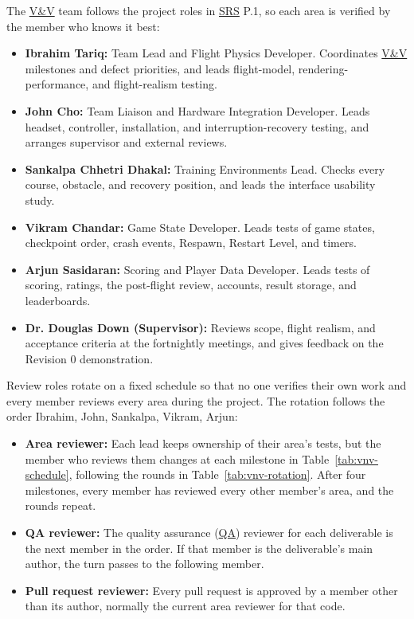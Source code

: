 \documentclass[12pt, titlepage]{article}
\begin{document}
The \hyperlink{abbr:VnV}{V\&V} team follows the project roles in \hyperlink{abbr:SRS}{SRS} P.1, so each area is verified by the
member who knows it best:

\begin{itemize}
  \item \textbf{Ibrahim Tariq:} Team Lead and Flight Physics Developer. Coordinates \hyperlink{abbr:VnV}{V\&V}
  milestones and defect priorities, and leads flight-model, rendering-performance, and
  flight-realism testing.
  \item \textbf{John Cho:} Team Liaison and Hardware Integration Developer. Leads
  headset, controller, installation, and interruption-recovery testing, and arranges
  supervisor and external reviews.
  \item \textbf{Sankalpa Chhetri Dhakal:} Training Environments Lead. Checks every
  course, obstacle, and recovery position, and leads the interface usability study.
  \item \textbf{Vikram Chandar:} Game State Developer. Leads tests of game states,
  checkpoint order, crash events, Respawn, Restart Level, and timers.
  \item \textbf{Arjun Sasidaran:} Scoring and Player Data Developer. Leads tests of
  scoring, ratings, the post-flight review, accounts, result storage, and leaderboards.
  \item \textbf{Dr. Douglas Down (Supervisor):} Reviews scope, flight realism, and
  acceptance criteria at the fortnightly meetings, and gives feedback on the Revision 0
  demonstration.
\end{itemize}

Review roles rotate on a fixed schedule so that no one verifies their own work and every
member reviews every area during the project. The rotation follows the order Ibrahim,
John, Sankalpa, Vikram, Arjun:

\begin{itemize}
  \item \textbf{Area reviewer:} Each lead keeps ownership of their area's tests, but the
  member who reviews them changes at each milestone in Table~\ref{tab:vnv-schedule},
  following the rounds in Table~\ref{tab:vnv-rotation}. After four milestones, every
  member has reviewed every other member's area, and the rounds repeat.
  \item \textbf{QA reviewer:} The quality assurance (\hyperlink{abbr:QA}{QA}) reviewer for each deliverable is
  the next member in the order. If that member is the deliverable's main author, the
  turn passes to the following member.
  \item \textbf{Pull request reviewer:} Every pull request is approved by a member other
  than its author, normally the current area reviewer for that code.
\end{itemize}
\end{document}
